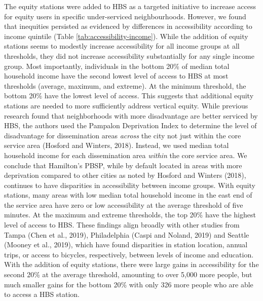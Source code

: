 \documentclass[]{elsarticle} %
\begin{document}
The equity stations were added to HBS as a targeted initiative to
increase access for equity users in specific under-serviced
neighbourhoods. However, we found that inequities persisted as evidenced
by differences in accessibility according to income quintile (Table
\ref{tab:accessibility-income}). While the addition of equity stations
seems to modestly increase accessibility for all income groups at all
thresholds, they did not increase accessibility substantially for any
single income group. Most importantly, individuals in the bottom 20\% of
median total household income have the second lowest level of access to
HBS at most thresholds (average, maximum, and extreme). At the minimum
threshold, the bottom 20\% have the lowest level of access. This
suggests that additional equity stations are needed to more sufficiently
address vertical equity. While previous research found that
neighborhoods with more disadvantage are better serviced by HBS, the
authors used the Pampalon Deprivation Index to determine the level of
disadvantage for dissemination areas \emph{across} the city not just
within the core service area (Hosford and Winters, 2018). Instead, we
used median total household income for each dissemination area
\emph{within} the core service area. We conclude that Hamilton's PBSP,
while by default located in areas with more deprivation compared to
other cities as noted by Hosford and Winters (2018), continues to have
disparities in accessibility between income groups. With equity
stations, many areas with low median total household income in the east
end of the service area have zero or low accessibility at the average
threshold of five minutes. At the maximum and extreme thresholds, the
top 20\% have the highest level of access to HBS. These findings align
broadly with other studies from Tampa (Chen et al., 2019), Philadelphia
(Caspi and Noland, 2019) and Seattle (Mooney et al., 2019), which have
found disparities in station location, annual trips, or access to
bicycles, respectively, between levels of income and education. With the
addition of equity stations, there were large gains in accessibility for
the second 20\% at the average threshold, amounting to over 5,000 more
people, but much smaller gains for the bottom 20\% with only 326 more
people who are able to access a HBS station.
\end{document}
